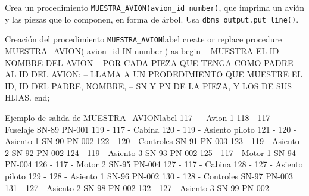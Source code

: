 \begin{homeworkProblem}
  Crea un procedimiento \texttt{MUESTRA\_AVION(avion\_id number)}, que imprima un avión y las piezas que lo componen, en forma de árbol. Usa \texttt{dbms\_output.put\_line()}.

\begin{listadosql}{Creación del procedimiento \texttt{MUESTRA\_AVION}}{label}
create or replace procedure MUESTRA_AVION( avion_id IN number ) 
as
begin
  -- MUESTRA EL ID NOMBRE DEL AVION
  -- POR CADA PIEZA QUE TENGA COMO PADRE AL ID DEL AVION:
  --   LLAMA A UN PRODEDIMIENTO QUE MUESTRE EL ID, ID DEL PADRE, NOMBRE, 
  --   SN Y PN DE LA PIEZA, Y LOS DE SUS HIJAS.
end;
\end{listadosql}


\begin{listadotxt}{Ejemplo de salida de MUESTRA\_AVION}{label}
117 -  - Avion 1  
    118 - 117 - Fuselaje SN-89 PN-001
    119 - 117 - Cabina  
        120 - 119 - Asiento piloto  
            121 - 120 - Asiento 1 SN-90 PN-002
            122 - 120 - Controles SN-91 PN-003
        123 - 119 - Asiento 2 SN-92 PN-002
        124 - 119 - Asiento 3 SN-93 PN-002
    125 - 117 - Motor 1 SN-94 PN-004
    126 - 117 - Motor 2 SN-95 PN-004
    127 - 117 - Cabina  
        128 - 127 - Asiento piloto  
            129 - 128 - Asiento 1 SN-96 PN-002
            130 - 128 - Controles SN-97 PN-003
        131 - 127 - Asiento 2 SN-98 PN-002
        132 - 127 - Asiento 3 SN-99 PN-002

\end{listadotxt}
  
\end{homeworkProblem}

